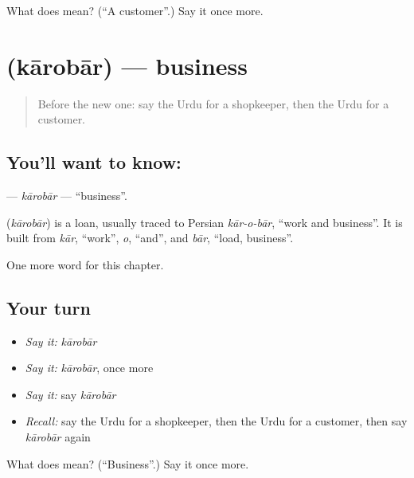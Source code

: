 \begin{tcolorbox}[breakable,colback=teal!4,colframe=teal!35!black,title={Before you move on}]
What does  mean? (\textquotedblleft{}A customer\textquotedblright{}.) Say it once more.
\end{tcolorbox}
\section[\texorpdfstring{\ur{کاروبار} (kārobār)}{کاروبار (kārobār)}]{ (kārobār) — business}

\label{lesson:UR-C236-karobar}



\begin{quote}
Before the new one: say the Urdu for a shopkeeper, then the Urdu for a customer.
\end{quote}

\subsection*{You'll want to know: }
\textbf{} — \emph{kārobār} — \textquotedblleft{}business\textquotedblright{}.

\begin{cousinweb}
\textbf{} (\emph{kārobār}) is a loan, usually traced to Persian \emph{kār-o-bār}, \textquotedblleft{}work and business\textquotedblright{}. It is built from \emph{kār}, \textquotedblleft{}work\textquotedblright{}, \emph{o}, \textquotedblleft{}and\textquotedblright{}, and \emph{bār}, \textquotedblleft{}load, business\textquotedblright{}.
\end{cousinweb}

\begin{grammarlens}[title={What you've built}]
One more word for this chapter.
\end{grammarlens}

\subsection*{Your turn}
\begin{itemize}
\raggedright
  \item \emph{Say it:} \emph{kārobār}
  \item \emph{Say it:} \emph{kārobār}, once more
  \item \emph{Say it:} say \emph{kārobār}
  \item \emph{Recall:} say the Urdu for a shopkeeper, then the Urdu for a customer, then say \emph{kārobār} again
\end{itemize}

\begin{tcolorbox}[breakable,colback=teal!4,colframe=teal!35!black,title={Before you move on}]
What does  mean? (\textquotedblleft{}Business\textquotedblright{}.) Say it once more.
\end{tcolorbox}
